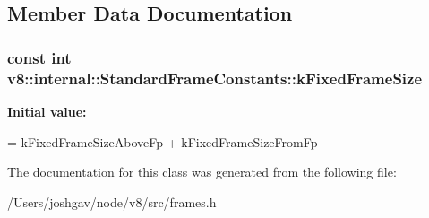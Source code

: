 \subsection{Member Data Documentation}
\subsubsection[{\texorpdfstring{k\+Fixed\+Frame\+Size}{kFixedFrameSize}}]{\setlength{\rightskip}{0pt plus 5cm}const int v8\+::internal\+::\+Standard\+Frame\+Constants\+::k\+Fixed\+Frame\+Size\hspace{0.3cm}{\ttfamily [static]}}\hypertarget{classv8_1_1internal_1_1_standard_frame_constants_a325d79d2b5cfb227a048269f1d8ff35c}{}\label{classv8_1_1internal_1_1_standard_frame_constants_a325d79d2b5cfb227a048269f1d8ff35c}
{\bfseries Initial value\+:}
\begin{DoxyCode}
=
      kFixedFrameSizeAboveFp + kFixedFrameSizeFromFp
\end{DoxyCode}


The documentation for this class was generated from the following file\+:\begin{DoxyCompactItemize}
\item 
/\+Users/joshgav/node/v8/src/frames.\+h\end{DoxyCompactItemize}
